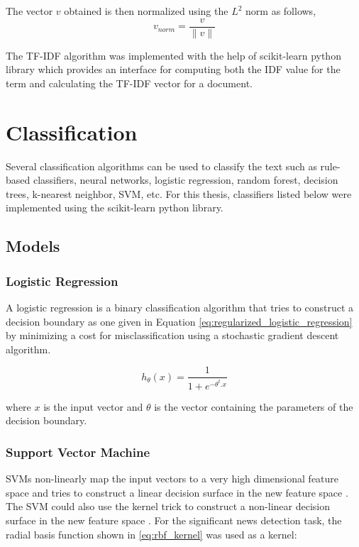 The vector $v$ obtained is then normalized using the $L^2$ norm as follows,
\begin{equation}
    v_{norm} = \frac{v}{\lVert v \rVert}
\end{equation}

The TF-IDF algorithm was implemented with the help of scikit-learn \cite{scikit-learn} python library which provides an interface for computing both the IDF value for the term and calculating the TF-IDF vector for a document.

\section{Classification}\label{classification}
Several classification algorithms can be used to classify the text such as rule-based classifiers, neural networks, logistic regression, random forest, decision trees, k-nearest neighbor, SVM\cite{cortes1995support}, etc. 
For this thesis, classifiers listed below were implemented using the scikit-learn python library.

\subsection{Models}
\subsubsection{Logistic Regression}
A logistic regression is a binary classification algorithm that tries to construct a decision boundary as one given in Equation \eqref{eq:regularized_logistic_regression} by minimizing a cost for misclassification using a stochastic gradient descent algorithm.

\begin{equation}
    \label{eq:regularized_logistic_regression}
    h_{\theta}(x) = \frac{1}{1 + {e}^{-{\theta}^{t}. x}}
\end{equation}

\noindent
where $x$ is the input vector and $\theta$ is the vector containing the parameters of the decision boundary. 

\subsubsection{Support Vector Machine}
SVMs non-linearly map the input vectors to a very high dimensional feature space and tries to construct a linear decision surface in the new feature space \cite{cortes1995support}. The SVM could also use the kernel trick to construct a non-linear decision surface in the new feature space \cite{cortes1995support}. For the significant news detection task, the radial basis function shown in \eqref{eq:rbf_kernel} was used as a kernel:

